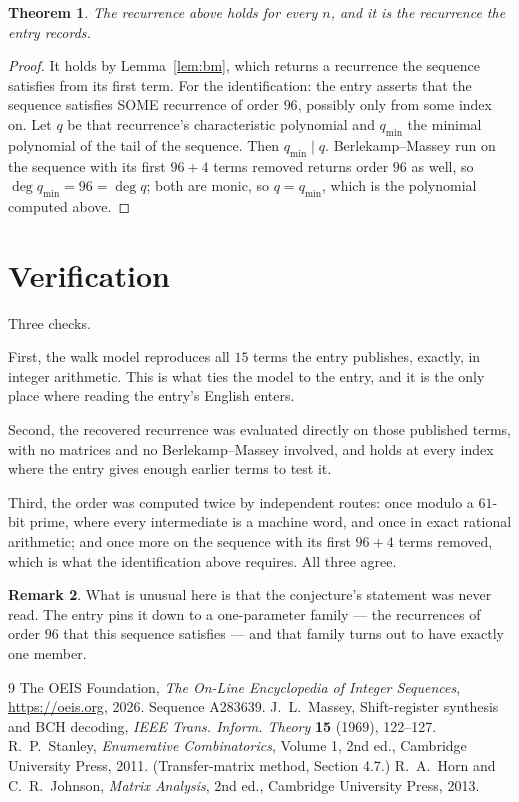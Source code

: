 \documentclass[11pt,a4paper]{article}
\theoremstyle{plain}
\newtheorem{theorem}{Theorem}
\theoremstyle{definition}
\newtheorem{remark}[theorem]{Remark}
\begin{document}
\begin{theorem}
The recurrence above holds for every $n$, and it is the recurrence the entry records.
\end{theorem}

\begin{proof}
It holds by Lemma~\ref{lem:bm}, which returns a recurrence the sequence satisfies from its
first term. For the identification: the entry asserts that the sequence satisfies SOME
recurrence of order $96$, possibly only from some index on. Let $q$ be that recurrence's
characteristic polynomial and $q_{\min}$ the minimal polynomial of the tail of the sequence.
Then $q_{\min}\mid q$. Berlekamp--Massey run on the sequence with its first $96+4$ terms
removed returns order $96$ as well, so $\deg q_{\min}=96=\deg q$; both are monic, so
$q=q_{\min}$, which is the polynomial computed above.
\end{proof}

\section{Verification}

Three checks.

First, the walk model reproduces all $15$ terms the entry publishes, exactly, in integer
arithmetic. This is what ties the model to the entry, and it is the only place where reading
the entry's English enters.

Second, the recovered recurrence was evaluated directly on those published terms, with no
matrices and no Berlekamp--Massey involved, and holds at every index where the entry gives
enough earlier terms to test it.

Third, the order was computed twice by independent routes: once modulo a $61$-bit prime, where
every intermediate is a machine word, and once in exact rational arithmetic; and once more on
the sequence with its first $96+4$ terms removed, which is what the identification above
requires. All three agree.

\begin{remark}
What is unusual here is that the conjecture's statement was never read. The entry pins it down
to a one-parameter family --- the recurrences of order $96$ that this sequence satisfies
--- and that family turns out to have exactly one member.
\end{remark}

\begin{thebibliography}{9}
 The OEIS Foundation, \emph{The On-Line Encyclopedia of Integer
Sequences}, \url{https://oeis.org}, 2026. Sequence A283639.
 J.~L.~Massey, Shift-register synthesis and BCH decoding, \emph{IEEE
Trans. Inform. Theory} \textbf{15} (1969), 122--127.
 R.~P.~Stanley, \emph{Enumerative Combinatorics}, Volume 1, 2nd ed.,
Cambridge University Press, 2011. (Transfer-matrix method, Section 4.7.)
 R.~A.~Horn and C.~R.~Johnson, \emph{Matrix Analysis}, 2nd ed., Cambridge
University Press, 2013.
\end{thebibliography}
\end{document}
